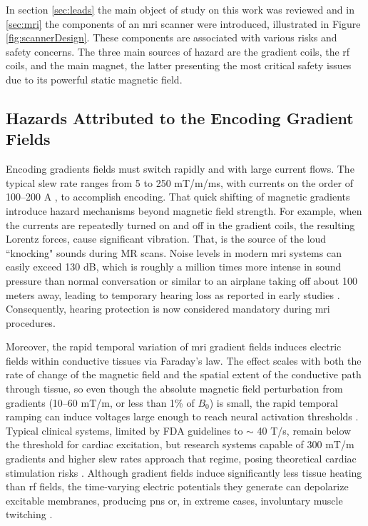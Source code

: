 In section \ref{sec:leads} the main object of study on this work was reviewed and in \ref{sec:mri} the components of an \gls{mri} scanner were introduced, illustrated in Figure \ref{fig:scannerDesign}. These components are associated with various risks and safety concerns. The three main sources of hazard are the gradient coils, the \gls{rf} coils, and the main magnet, the latter presenting the most critical safety issues due to its powerful static magnetic field. 

\subsection{Hazards Attributed to the Encoding Gradient Fields}
\label{sec:gradients-induction-sound}

Encoding gradients fields must switch rapidly and with large current flows.  The typical slew rate ranges from 5 to 250 mT/m/ms, with currents on the order of 100–200 A \cite{bushberg2011,Prince_MedicalImaging_2015}, to accomplish encoding. That quick shifting of magnetic gradients introduce hazard mechanisms beyond magnetic field strength. For example, when the currents are repeatedly turned on and off in the gradient coils, the resulting Lorentz forces, cause significant vibration. That, is the source of the loud ``knocking" sounds during MR scans. Noise levels in modern \gls{mri} systems can easily exceed 130 dB, which is roughly a million times more intense in sound pressure than normal conversation or similar to an airplane taking off about 100 meters away, leading to temporary hearing loss as reported in early studies \cite{panych2018}. Consequently, hearing protection is now considered mandatory during \gls{mri} procedures.

Moreover, the rapid temporal variation of \gls{mri} gradient fields induces electric fields within conductive tissues via Faraday’s law. The effect scales with both the rate of change of the magnetic field and the spatial extent of the conductive path through tissue, so even though the absolute magnetic field perturbation from gradients (10–60 mT/m, or less than 1\% of $B_0$) is small, the rapid temporal ramping can induce voltages large enough to reach neural activation thresholds \cite{Davids:2017aa}. Typical clinical systems, limited by FDA guidelines to $\sim$ 40 T/s, remain below the threshold for cardiac excitation, but research systems capable of 300 mT/m gradients and higher slew rates approach that regime, posing theoretical cardiac stimulation risks \cite{bushberg2011, panych2018,Prince_MedicalImaging_2015}. Although gradient fields induce significantly less tissue heating than \gls{rf} fields, the time-varying electric potentials they generate can depolarize excitable membranes, producing \gls{pns} or, in extreme cases, involuntary muscle twitching \cite{panych2018,Grainger_MHRA_2014}.

